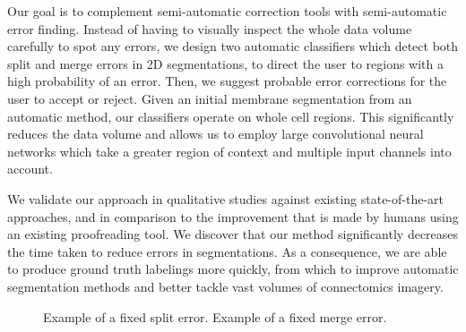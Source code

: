 Our goal is to complement semi-automatic correction tools with semi-automatic error finding. Instead of having to visually inspect the whole data volume carefully to spot any errors, we design two automatic classifiers which detect both split and merge errors in 2D segmentations, to direct the user to regions with a high probability of an error. Then, we suggest probable error corrections for the user to accept or reject. Given an initial membrane segmentation from an automatic method, our classifiers operate on whole cell regions. This significantly reduces the data volume and allows us to employ large convolutional neural networks which take a greater region of context and multiple input channels into account.

We validate our approach in qualitative studies against existing state-of-the-art approaches, and in comparison to the improvement that is made by humans using an existing proofreading tool. We discover that our method significantly decreases the time taken to reduce errors in segmentations. As a consequence, we are able to produce ground truth labelings more quickly, from which to improve automatic segmentation methods and better tackle vast volumes of connectomics imagery.

\begin{figure}
\caption{Example of a fixed split error. Example of a fixed merge error.}
\end{figure}